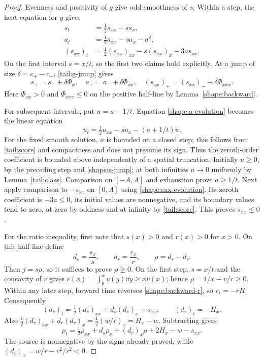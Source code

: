 \begin{proof}
Evenness and positivity of $g$ give odd smoothness of $s$.  Within a step,
the heat equation for $g$ gives
\begin{align}
 s_t&=\tfrac12s_{xx}-s s_x,
       \label{shape:s-evolution}\\
 a_t&=\tfrac12a_{xx}-s a_x-a^2,
       \label{shape:a-evolution}\\
 (s_{xx})_t&=\tfrac12(s_{xx})_{xx}
                  -s(s_{xx})_x-3a s_{xx}.
       \label{shape:sxx-evolution}
\end{align}
On the first interval $s=x/t$, so the first two claims hold explicitly.
At a jump of size $\delta=c_+-c_-$, \eqref{tail:g-jump} gives
\begin{equation}\label{shape:s-jump}
 s_+=s_-+\delta\Phi_x,
 \quad a_+=a_-+\delta\Phi_{xx},
 \quad (s_{xx})_+=(s_{xx})_-+\delta\Phi_{xxx}.
\end{equation}
Here $\Phi_{xx}>0$ and $\Phi_{xxx}\le0$ on the positive half-line by
Lemma~\ref{shape:backward}.

For subsequent intervals, put $u=a-1/t$.  Equation
\eqref{shape:a-evolution} becomes the linear equation
\[
 u_t=\tfrac12u_{xx}-s u_x-(a+1/t)u.
\]
For the fixed smooth solution, $a$ is bounded on a closed step; this
follows from \eqref{tail:score} and compactness and does not presume its
sign.  Thus the zeroth-order coefficient is bounded above independently
of a spatial truncation.  Initially $u\ge0$, by the preceding step and
\eqref{shape:s-jump}; at both infinities $u\to0$ uniformly by
Lemma~\ref{tail:class}.  Comparison on $[-A,A]$ and exhaustion prove
$a\ge1/t$.  Next apply comparison to $-s_{xx}$ on $[0,A]$ using
\eqref{shape:sxx-evolution}.  Its zeroth coefficient is $-3a\le0$,
its initial values are nonnegative, and its boundary values tend to
zero, at zero by oddness and at infinity by \eqref{tail:score}.  This
proves $s_{xx}\le0$.

For the ratio inequality, first note that $s(x)>0$ and $r(x)>0$ for
$x>0$.  On this half-line define
\[
 d_s=\frac{s_x}{s},\qquad d_r=\frac{r_x}{r},\qquad \rho=d_s-d_r.
\]
Then $j=s\rho$, so it suffices to prove $\rho\ge0$.
On the first step, $s=x/t$ and the concavity of $r$ gives
$r(x)=\int_0^x v(y)\dd y\ge xv(x)$; hence
$\rho=1/x-v/r\ge0$.
Within any later step, forward time reverses \eqref{shape:backward-r},
so $r_t=-rH$.  Consequently
\[
 (d_s)_t=\tfrac12(d_s)_{xx}+d_s(d_s)_x-s_{xx},
 \qquad (d_r)_t=-H_x.
\]
Also
$\tfrac12(d_r)_{xx}+d_r(d_r)_x
 =\tfrac12(w/r)_x=H_x-w$.
Subtracting gives
\begin{equation}\label{shape:G-evolution}
 \rho_t=\tfrac12\rho_{xx}+d_s\rho_x+(d_r)_x\rho
                         +2H_x-w-s_{xx}.
\end{equation}
The source is nonnegative by the signs already proved, while
$(d_r)_x=w/r-v^2/r^2<0$.


\end{proof}
